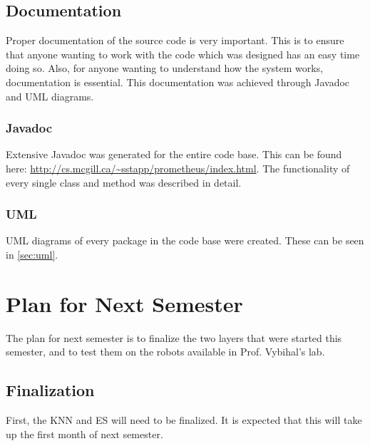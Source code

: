 \documentclass[titlepage,11pt]{article}
\begin{document}
\subsection{Documentation}

Proper documentation of the source code is very important. This is to ensure that anyone wanting to work with the code which was designed has an easy time doing so. Also, for anyone wanting to understand how the system works, documentation is essential. This documentation was achieved through Javadoc and UML diagrams.

\subsubsection{Javadoc}

Extensive Javadoc was generated for the entire code base. This can be found here: \url{http://cs.mcgill.ca/~sstapp/prometheus/index.html}. The functionality of every single class and method was described in detail.

\subsubsection{UML}

UML diagrams of every package in the code base were created. These can be seen in \autoref{sec:uml}.

\section{Plan for Next Semester}
\label{sec:plan}


The plan for next semester is to finalize the two layers that were started this semester, and to test them on the robots available in Prof. Vybihal's lab.

\subsection{Finalization}

First, the KNN and ES will need to be finalized. It is expected that this will take up the first month of next semester.
\end{document}
